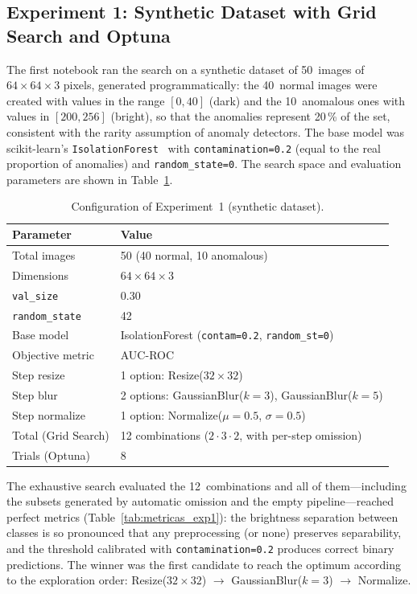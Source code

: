 \documentclass[conference]{IEEEtran}
\begin{document}
\subsection{Experiment 1: Synthetic Dataset with Grid Search and Optuna}

The first notebook ran the search on a synthetic dataset of 50~images of
$64\times64\times3$ pixels, generated programmatically: the 40~normal images
were created with values in the range $[0, 40]$ (dark) and the 10~anomalous
ones with values in $[200, 256]$ (bright), so that the anomalies represent
20\,\% of the set, consistent with the rarity assumption of anomaly detectors.
The base model was scikit-learn's \texttt{IsolationForest}~\cite{pedregosa2011sklearn}
with \texttt{contamination=0.2} (equal to the real proportion of anomalies) and
\texttt{random\_state=0}. The search space and evaluation parameters are shown
in Table~\ref{tab:espacio_exp1}.

\begin{table}[t]
\centering
\renewcommand{\arraystretch}{1.2}
\caption{Configuration of Experiment~1 (synthetic dataset).}
\label{tab:espacio_exp1}
\begin{tabular}{@{}ll@{}}
\toprule
\textbf{Parameter} & \textbf{Value} \\
\midrule
Total images        & 50 (40 normal, 10 anomalous) \\
Dimensions          & $64\times64\times3$ \\
\texttt{val\_size}  & 0.30 \\
\texttt{random\_state} & 42 \\
Base model          & IsolationForest (\texttt{contam=0.2}, \texttt{random\_st=0}) \\
Objective metric    & AUC-ROC \\
Step resize         & 1 option: Resize($32\times32$) \\
Step blur           & 2 options: GaussianBlur($k=3$), GaussianBlur($k=5$) \\
Step normalize      & 1 option: Normalize($\mu=0.5$, $\sigma=0.5$) \\
Total (Grid Search) & 12 combinations ($2\cdot3\cdot2$, with per-step omission) \\
Trials (Optuna)     & 8 \\
\bottomrule
\end{tabular}
\end{table}

The exhaustive search evaluated the 12~combinations and all of them—including
the subsets generated by automatic omission and the empty pipeline—reached
perfect metrics (Table~\ref{tab:metricas_exp1}): the brightness separation
between classes is so pronounced that any preprocessing (or none) preserves
separability, and the threshold calibrated with \texttt{contamination=0.2}
produces correct binary predictions. The winner was the first candidate to
reach the optimum according to the exploration order: Resize($32\times32$)
$\to$ GaussianBlur($k=3$) $\to$ Normalize.
\end{document}

